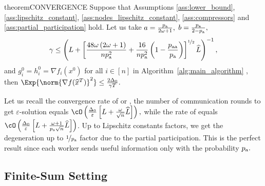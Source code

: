 \documentclass{article}
\newcommand{\algorithmname}{DASHA-PP}
\newcommand*{\probavailable}{\ensuremath{p_{\textnormal{a}}}}
\newcommand*{\probpairaa}{\ensuremath{p_{\textnormal{aa}}}}
\begin{document}
\label{sec:gradien_setting}

\begin{restatable}{theorem}{CONVERGENCE}
  \label{theorem:gradient_oracle}
  Suppose that Assumptions \ref{ass:lower_bound}, \ref{ass:lipschitz_constant}, \ref{ass:nodes_lipschitz_constant}, \ref{ass:compressors} and \ref{ass:partial_participation} hold. Let us take $a = \frac{\probavailable}{2 \omega + 1} ,$ $b = \frac{\probavailable}{2 - \probavailable},$ {\scriptsize \begin{align*}\gamma \leq \left(L + \left[\frac{48 \omega \left(2 \omega + 1\right)}{n \probavailable^2} + \frac{16}{n \probavailable^2}\left(1 - \frac{\probpairaa}{\probavailable}\right)\right]^{\nicefrac{1}{2}}\widehat{L}\right)^{-1},\end{align*}} and $g^{0}_i = h^{0}_i = \nabla f_i(x^0)$ for all $i \in [n]$
  in Algorithm~\ref{alg:main_algorithm} \algname{(\algorithmname)}, then $\Exp{\norm{\nabla f(\widehat{x}^T)}^2} \leq \frac{2 \Delta_0}{\gamma T}.$
\end{restatable}

Let us recall the convergence rate of  or , the number of communication rounds to get $\varepsilon$-solution equals
$\cO\left(\frac{\Delta_0}{\varepsilon}\left[L + \frac{\omega}{\sqrt{n}}\widehat{L}\right]\right),$ while the rate of \algname{\algorithmname} equals $\cO\left(\frac{\Delta_0}{\varepsilon}\left[L + \frac{\omega + 1}{\probavailable \sqrt{n}}\widehat{L}\right]\right)$. Up to Lipschitz constants factors, we get the degeneration up to $\nicefrac{1}{\probavailable}$ factor due to the partial participation. This is the perfect result since each worker sends useful information only with the probability $\probavailable.$

\subsection{Finite-Sum Setting}

\label{sec:finite_sum_setting}
\end{document}
